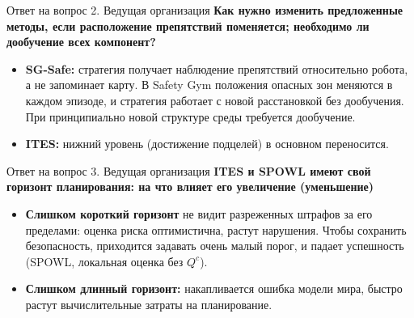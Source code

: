
\begin{frame}[noframenumbering]{Ответ на вопрос 2. Ведущая организация}
    \small
    \textbf{Как нужно изменить предложенные методы, если расположение препятствий поменяется; необходимо ли дообучение всех компонент?}

    \vspace{0.4em}
    \begin{itemize}
        \item \textbf{SG-Safe:} стратегия получает наблюдение препятствий
              относительно робота, а не запоминает карту. В Safety Gym
              положения опасных зон меняются в каждом эпизоде, и стратегия
              работает с новой расстановкой без дообучения. При принципиально
              новой структуре среды требуется дообучение.
        \item \textbf{ITES:} нижний уровень (достижение подцелей) в основном
              переносится.
    \end{itemize}
\end{frame}


\begin{frame}[noframenumbering]{Ответ на вопрос 3. Ведущая организация}
    \small
    \textbf{ITES и SPOWL имеют свой горизонт планирования: на что влияет его увеличение (уменьшение)}

    \vspace{0.4em}
    \begin{itemize}
        \item \textbf{Слишком короткий горизонт} не видит разреженных
              штрафов за его пределами: оценка риска оптимистична, растут
              нарушения. Чтобы сохранить безопасность, приходится задавать
              очень малый порог, и падает успешность (SPOWL, локальная оценка
              без $Q^c$).
        \item \textbf{Слишком длинный горизонт:} накапливается ошибка модели
              мира, быстро растут вычислительные затраты на планирование.
    \end{itemize}
\end{frame}

